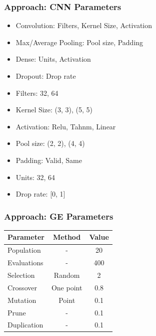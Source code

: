 \documentclass[aspectratio=169]{beamer}
\begin{document}
		\begin{frame}
			\frametitle{Approach: CNN Parameters}
			
			\begin{itemize}
				\item Convolution: Filters, Kernel Size, Activation
				\item Max/Average Pooling: Pool size, Padding
				\item Dense: Units, Activation
				\item Dropout: Drop rate
				\item Filters: 32, 64
				\item Kernel Size: (3, 3), (5, 5)
				\item Activation: Relu, Tahnm, Linear
				\item Pool size: (2, 2), (4, 4)
				\item Padding: Valid, Same
				\item Units: 32, 64
				\item Drop rate: [0, 1]
			\end{itemize}
		
		\end{frame}
		\begin{frame}
			\frametitle{Approach: GE Parameters}
			
			\begin{table}
				\begin{tabular}{l|c|c}
					\textbf{Parameter} & \textbf{Method} & \textbf{Value} \\ \hline
					Population         &        -        &       20       \\ \hline
					Evaluations        &        -        &      400       \\ \hline
					Selection          &     Random      &       2        \\ \hline
					Crossover          &    One point    &      0.8       \\ \hline
					Mutation           &      Point      &      0.1       \\ \hline
					Prune              &        -        &      0.1       \\ \hline
					Duplication        &        -        &      0.1       \\ \hline
				\end{tabular}
			\end{table}
		
		\end{frame}
\end{document}
